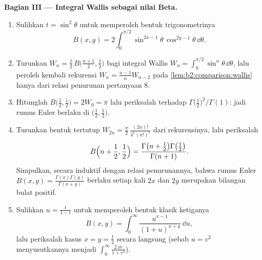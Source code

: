 \begin{problem}
\medskip
\noindent\textbf{Bagian III --- Integral Wallis sebagai nilai Beta.}
\begin{enumerate}[resume]
  \item Sulihkan $t = \sin^2\theta$ untuk memperoleh bentuk
        trigonometrinya
        \[
        B(x, y) = 2\int_0^{\pi/2}
        \sin^{2x-1}\theta\,\cos^{2y-1}\theta\,\dd\theta .
        \]
  \item Turunkan $W_n = \frac12\,B\bigl(\frac{n+1}2, \frac12\bigr)$
        bagi integral Wallis $W_n = \int_0^{\pi/2}\sin^n
        \theta\,\dd\theta$, lalu peroleh kembali rekurensi $W_n =
        \frac{n-1}{n}W_{n-2}$ pada \cref{lem:b2:comparison:wallis}
        hanya dari relasi penurunan pertanyaan 8.
  \item Hitunglah $B\bigl(\frac12, \frac12\bigr) = 2W_0 = \pi$ lalu
        periksalah terhadap $\Gamma\bigl(\frac12\bigr)^2/\Gamma(1)$:
        jadi rumus Euler berlaku di $\bigl(\frac12, \frac12\bigr)$.
  \item Turunkan bentuk tertutup $W_{2n} = \frac\pi2\,
        \frac{(2n)!}{4^n(n!)^2}$ dari rekurensinya, lalu periksalah
        \[
        B\Bigl(n + \frac12, \frac12\Bigr)
        = \frac{\Gamma\bigl(n + \frac12\bigr)\Gamma\bigl(
        \frac12\bigr)}{\Gamma(n+1)} .
        \]
        Simpulkan, secara induktif dengan relasi penurunannya, bahwa
        rumus Euler $B(x,y) =
        \frac{\Gamma(x)\Gamma(y)}{\Gamma(x+y)}$ berlaku setiap kali
        $2x$ dan $2y$ merupakan bilangan bulat positif.
  \item Sulihkan $u = \frac{t}{1-t}$ untuk memperoleh bentuk klasik
        ketiganya
        \[
        B(x,y) = \int_0^\infty
        \frac{u^{x-1}}{(1+u)^{x+y}}\,\dd u ,
        \]
        lalu periksalah kasus $x = y = \frac12$ secara langsung (sebab
        $u = v^2$ menyusutkannya menjadi $\int_0^\infty\frac{2\,\dd v}{1+v^2}$).
\end{enumerate}


\end{problem}
